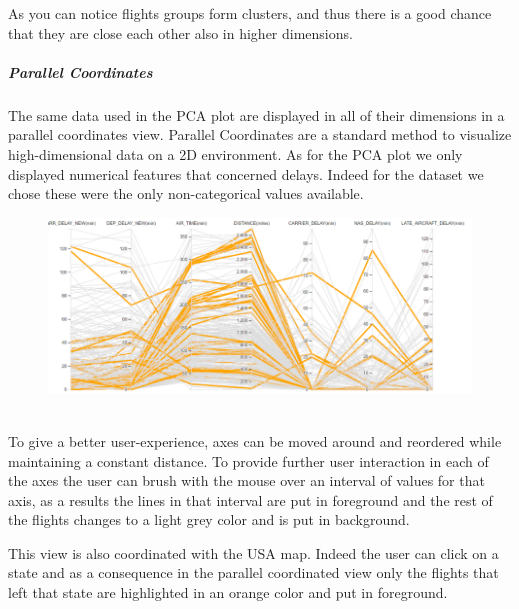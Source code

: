 \documentclass[a4paper, 12pt]{article}
\begin{document}
As you can notice flights groups form clusters, and thus there is a good chance that
they are close each other also in higher dimensions.
\clearpage

\subparagraph{Parallel Coordinates}
The same data used in the PCA plot are displayed in all of their dimensions in a parallel coordinates
view. Parallel Coordinates are a standard method to visualize high-dimensional data on a 2D environment. 
As for the PCA plot we only displayed numerical features that concerned delays. Indeed for the dataset we
chose these were the only non-categorical values available.
\\
\begin{figure}[h]	
\centering
\includegraphics[scale=0.7]{pc.PNG}
\end{figure}
\\
To give a better user-experience, axes can be moved around and reordered while maintaining a constant 
distance. To provide further user interaction in each of the axes the user can brush with the mouse over
an interval of values for that axis, as a results the lines in that interval are put in foreground and
the rest of the flights changes to a light grey color and is put in background.

This view is also coordinated with the USA map. Indeed the user can click on a state and as a 
consequence in the parallel coordinated view only the flights that left that state are highlighted in an
orange color and put in foreground.
\end{document}
